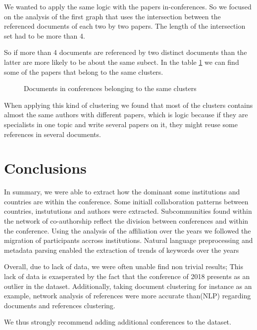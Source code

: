 \documentclass[article,twocolumn]{IEEEtran}
\begin{document}
    We wanted to apply the same logic with the papers in-conferences. So we
focused on the analysis of the first graph that uses the intersection
between the referenced documents of each two by two papers. The length
of the intersection set had to be more than 4.

So if more than 4 documents are referenced by two distinct documents
than the latter are more likely to be about the same subect. In the
table \ref{fig11} we can find some of the papers that belong to the same
clusters.


    \begin{figure}
        \begin{center}\end{center}
        \caption{Documents in conferences belonging to the same clusters}
        \label{fig11}
    \end{figure}
    
    When applying this kind of clustering we found that most of the clusters
contains almost the same authors with different papers, which is logic
because if they are specialists in one topic and write several papers on
it, they might reuse some references in several documents.

    \hypertarget{conclusions}{%
\section{Conclusions}\label{conclusions}}

In summary, we were able to extract how the dominant some institutions
and countries are within the conference. Some initiall collaboration
patterns between countries, instututions and authors were extracted.
Subcommunities found within the network of co-authorship reflect the
division between conferences and within the conference. Using the
analysis of the affiliation over the years we followed the migration of
participants accross institutions. Natural language preprocessing and
metadata parsing enabled the extraction of trends of keywords over the
years

Overall, due to lack of data, we were often unable find non trivial
results; This lack of data is exasperated by the fact that the
conference of 2018 presents as an outlier in the dataset. Additionally,
taking document clustering for instance as an example, network analysis
of references were more accurate than(NLP) regarding documents and
references clustering.

We thus strongly recommend adding additional conferences to the dataset.
\newpage

    
    



    
    
\end{document}
